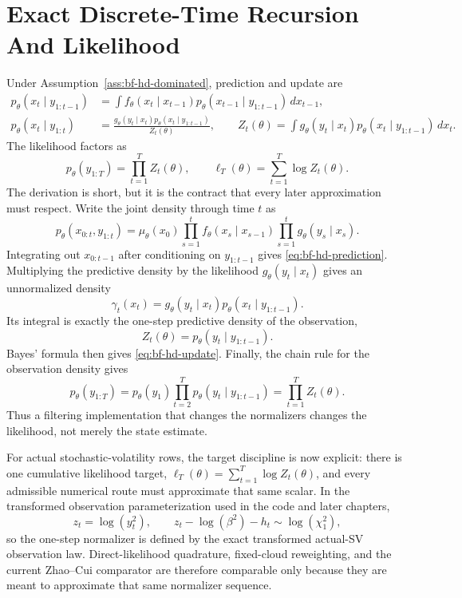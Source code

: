\section{Exact Discrete-Time Recursion And Likelihood}
\label{sec:bf-hd-exact-recursion}

Under Assumption~\ref{ass:bf-hd-dominated}, prediction and update are
\begin{align}
  p_\theta(x_t\mid y_{1:t-1})
    &= \int f_\theta(x_t\mid x_{t-1})
       p_\theta(x_{t-1}\mid y_{1:t-1})\,dx_{t-1},
       \label{eq:bf-hd-prediction}\\
  p_\theta(x_t\mid y_{1:t})
    &= \frac{g_\theta(y_t\mid x_t)p_\theta(x_t\mid y_{1:t-1})}
            {Z_t(\theta)},\qquad
  Z_t(\theta)=\int g_\theta(y_t\mid x_t)
       p_\theta(x_t\mid y_{1:t-1})\,dx_t .
       \label{eq:bf-hd-update}
\end{align}
The likelihood factors as
\begin{equation}
  p_\theta(y_{1:T})=\prod_{t=1}^T Z_t(\theta),\qquad
  \ell_T(\theta)=\sum_{t=1}^T \log Z_t(\theta).
  \label{eq:bf-hd-likelihood-factor}
\end{equation}
The derivation is short, but it is the contract that every later approximation
must respect.  Write the joint density through time \(t\) as
\[
  p_\theta(x_{0:t},y_{1:t})
  =
  \mu_\theta(x_0)
  \prod_{s=1}^t f_\theta(x_s\mid x_{s-1})
  \prod_{s=1}^t g_\theta(y_s\mid x_s).
\]
Integrating out \(x_{0:t-1}\) after conditioning on \(y_{1:t-1}\) gives
\eqref{eq:bf-hd-prediction}.  Multiplying the predictive density by the
likelihood \(g_\theta(y_t\mid x_t)\) gives an unnormalized density
\[
  \gamma_t(x_t)=g_\theta(y_t\mid x_t)
       p_\theta(x_t\mid y_{1:t-1}).
\]
Its integral is exactly the one-step predictive density of the observation,
\[
  Z_t(\theta)=p_\theta(y_t\mid y_{1:t-1}).
\]
Bayes' formula then gives \eqref{eq:bf-hd-update}.  Finally, the chain rule for
the observation density gives
\[
  p_\theta(y_{1:T})
  =p_\theta(y_1)\prod_{t=2}^T p_\theta(y_t\mid y_{1:t-1})
  =\prod_{t=1}^T Z_t(\theta).
\]
Thus a filtering implementation that changes the normalizers changes the
likelihood, not merely the state estimate.

For actual stochastic-volatility rows, the target discipline is now explicit:
there is one cumulative likelihood target,
\(
\ell_T(\theta)=\sum_{t=1}^T\log Z_t(\theta)
\),
and every admissible numerical route must approximate that same scalar.  In the
transformed observation parameterization used in the code and later chapters,
\[
  z_t=\log(y_t^2),
  \qquad
  z_t-\log(\beta^2)-h_t\sim \log(\chi_1^2),
\]
so the one-step normalizer is defined by the exact transformed actual-SV
observation law.  Direct-likelihood quadrature, fixed-cloud reweighting, and the
current Zhao--Cui comparator are therefore comparable only because they are meant
to approximate that same normalizer sequence.

